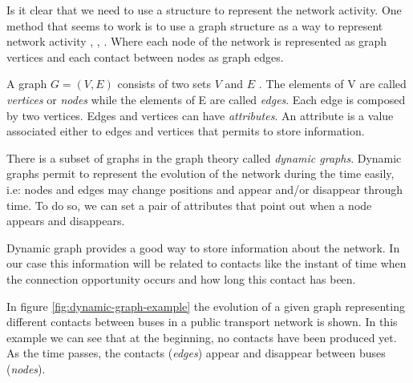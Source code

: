 
Is it clear that we need to use a structure to represent the network activity. One method that seems to work is to use a graph structure as a way to represent network activity \cite{probabilistic-dtn}, \cite{deterministic-dtn}, \cite{contact-graph}. Where each node of the network is represented as graph vertices and each contact between nodes as graph edges. 

A graph $G = (V, E)$ consists of two sets $V$ and $E$ \cite{gross2013handbook}. The elements of V are called \textit{vertices} or \textit{nodes} while the elements of E are called \textit{edges}. Each edge is composed by two vertices. Edges and vertices can have \textit{attributes}. An attribute is a value associated either to edges and vertices that permits to store information.

There is a subset of graphs in the graph theory called \textit{dynamic graphs}. Dynamic graphs permit to represent the evolution of the network during the time easily, i.e: nodes and edges may change positions and appear and/or disappear through time. To do so, we can set a pair of attributes that point out when a node appears and disappears.

Dynamic graph provides a good way to store information about the network. In our case this information will be related to contacts like the instant of time when the connection opportunity occurs and how long this contact has been.

In figure \ref{fig:dynamic-graph-example} the evolution of a given graph representing different contacts between buses in a public transport network is shown. In this example we can see that at the beginning, no contacts have been produced yet. As the time passes, the contacts (\textit{edges}) appear and disappear between buses (\textit{nodes}). 

